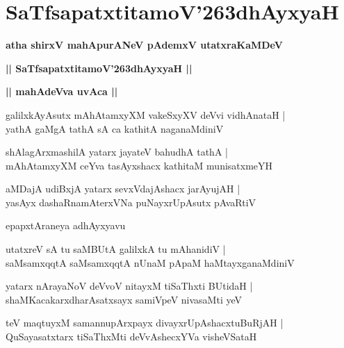 \documentclass[twoside,12pt,openright]{book}
\def\S{\char'263}
\newcounter{shloka}[chapter]
\def\uvaca#1{\centerline{{\large\textbf{#1}}}}
\begin{document}
\chapter{SaTfsapatxtitamoV\S dhAyxyaH}

\begin{center}
{\LARGE\bfseries atha shirxV mahApurANeV pAdemxV utatxraKaMDeV}
\end{center}

\begin{center}
{\LARGE\bfseries || SaTfsapatxtitamoV\S dhAyxyaH || }
\end{center}

\uvaca{|| mahAdeVva uvAca ||}

\begin{shloka}%
galilxkAyAsutx mAhAtamxyXM vakeSxyXV deVvi vidhAnataH |\\
yathA gaMgA tathA sA ca kathitA naganaMdiniV 
\end{shloka}

\begin{shloka}%
shAlagArxmashilA yatarx jayateV bahudhA tathA |\\
mAhAtamxyXM ceYva tasAyxshacx kathitaM munisatxmeYH 
\end{shloka}

\begin{shloka}%
aMDajA udiBxjA yatarx sevxVdajAshacx jarAyujAH |\\
yasAyx dashaRnamAterxVNa puNayxrUpAsutx pAvaRtiV 
\end{shloka}

\begin{center}
epapxtAraneya adhAyxyavu
\end{center}

\begin{shloka}%
utatxreV sA tu saMBUtA galilxkA tu mAhanidiV |\\
saMsamxqqtA saMsamxqqtA nUnaM pApaM haMtayxganaMdiniV 
\end{shloka}

\begin{shloka}%
yatarx nArayaNoV deVvoV nitayxM tiSaThxti BUtidaH |\\
shaMKacakarxdharAsatxsayx samiVpeV nivasaMti yeV 
\end{shloka}

\begin{shloka}%
teV maqtuyxM samannupArxpayx divayxrUpAshacxtuBuRjAH |\\
QuSayasatxtarx tiSaThxMti deVvAshecxYVa visheVSataH 
\end{shloka}
\end{document}

